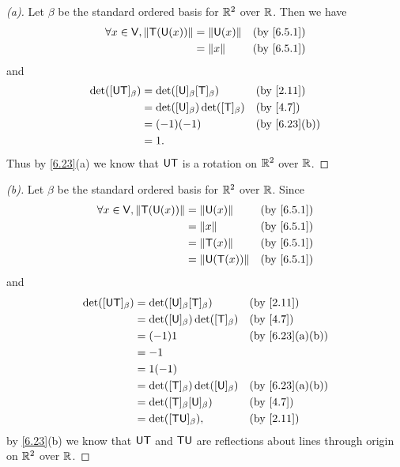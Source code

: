 \begin{proof}[(a)]
  Let \(\beta\) be the standard ordered basis for \(\mathbb{R}^2\) over \(\mathbb{R}\).
  Then we have
  \begin{align*}
    \forall x \in \V, \norm{\T(\U(x))} & = \norm{\U(x)} &  & \by{6.5.1} \\
                                       & = \norm{x}     &  & \by{6.5.1}
  \end{align*}
  and
  \begin{align*}
    \det([\U \T]_{\beta}) & = \det([\U]_{\beta} [\T]_{\beta})       &  & \by{2.11}    \\
                          & = \det([\U]_{\beta}) \det([\T]_{\beta}) &  & \by{4.7}     \\
                          & = (-1) (-1)                             &  & \by{6.23}[b] \\
                          & = 1.
  \end{align*}
  Thus by \cref{6.23}(a) we know that \(\mathsf{U} \mathsf{T}\) is a rotation on \(\mathbb{R}^2\) over \(\mathbb{R}\).
\end{proof}

\begin{proof}[(b)]
  Let \(\beta\) be the standard ordered basis for \(\mathbb{R}^2\) over \(\mathbb{R}\).
  Since
  \begin{align*}
    \forall x \in \V, \norm{\T(\U(x))} & = \norm{\U(x)}     &  & \by{6.5.1} \\
                                       & = \norm{x}         &  & \by{6.5.1} \\
                                       & = \norm{\T(x)}     &  & \by{6.5.1} \\
                                       & = \norm{\U(\T(x))} &  & \by{6.5.1}
  \end{align*}
  and
  \begin{align*}
    \det([\U \T]_{\beta}) & = \det([\U]_{\beta} [\T]_{\beta})       &  & \by{2.11}      \\
                          & = \det([\U]_{\beta}) \det([\T]_{\beta}) &  & \by{4.7}       \\
                          & = (-1) 1                                &  & \by{6.23}[a,b] \\
                          & = -1                                                        \\
                          & = 1 (-1)                                                    \\
                          & = \det([\T]_{\beta}) \det([\U]_{\beta}) &  & \by{6.23}[a,b] \\
                          & = \det([\T]_{\beta} [\U]_{\beta})       &  & \by{4.7}       \\
                          & = \det([\T \U]_{\beta}),                &  & \by{2.11}
  \end{align*}
  by \cref{6.23}(b) we know that \(\mathsf{U} \mathsf{T}\) and \(\mathsf{T} \mathsf{U}\) are reflections about lines through origin on \(\mathbb{R}^2\) over \(\mathbb{R}\).
\end{proof}
